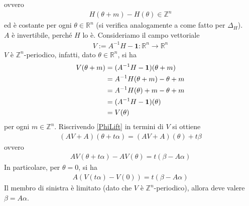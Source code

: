 \documentclass[twoside, 11pt]{amsbook}
\makeatletter
\newcommand{\0}{{(0)}}
\newcommand{\3}{{(3)}}
\theoremstyle{colonplain}
\theoremstyle{colondefinition}
\theoremstyle{colonremark}
\numberwithin{equation}{chapter}
\renewcommand{\proofname}{Dimostrazione}
\renewenvironment{proof}[1][\proofname]{\par
  \pushQED{\qed}%
  \normalfont \topsep6\p@\@plus6\p@\relax
  \trivlist
  \item[\hskip\labelsep\bfseries #1:]\ignorespaces
}{%
  \popQED\endtrivlist\@endpefalse
}
\makeatother
\begin{document}
\begin{proof}
ovvero
\begin{align}
    H(\theta + m) - H(\theta) \in \mathbb{Z}^n
 \end{align}
ed è costante per ogni $\theta \in \mathbb{R}^n$ (si verifica analogamente a come fatto per $\Delta_H$). \\
$A$ è invertibile, perché $H$ lo è. Consideriamo il campo vettoriale
\begin{align}
    V := A^{-1}H - \mathbf{1} : \mathbb{R}^n \longrightarrow \mathbb{R}^n
\end{align}
$V$ è $\mathbb{Z}^n$-periodico, infatti, dato $\theta \in \mathbb{R}^n$, si ha
\begin{align}
    V(\theta + m) &= (A^{-1}H - \mathbf{1})(\theta + m) \notag \\
    &= A^{-1}H(\theta + m) - \theta + m \notag \\
    &= A^{-1}H(\theta) + m - \theta + m \notag \\
    &= (A^{-1}H - \mathbf{1})(\theta) \notag \\
    &= V(\theta)
\end{align}
per ogni $m \in \mathbb{Z}^n$. Riscrivendo \eqref{PhiLift} in termini di $V$ si ottiene
\begin{align}
    (AV + A)(\theta + t\alpha) = (AV + A)(\theta) + t\beta
\end{align}
ovvero
\begin{align}
    AV(\theta + t\alpha) - AV(\theta) = t(\beta - A\alpha)
\end{align}
In particolare, per $\theta = 0$, si ha
\begin{align}
    A(V(t\alpha) - V(0)) = t(\beta - A\alpha)
\end{align}
Il membro di sinistra è limitato (dato che $V$ è $\mathbb{Z}^n$-periodico), allora deve valere $\beta = A\alpha$. \end{proof}
\end{document}
